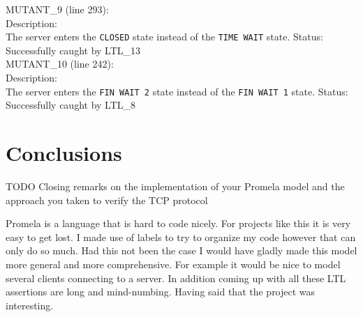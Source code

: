 \documentclass{WigReport} \usepackage{epsfig} %
\begin{document}
MUTANT\_9 (line 293):\\
Description:\\
The server enters the \verb|CLOSED| state instead of the \verb|TIME WAIT| state.
Status: Successfully caught by LTL\_13
\\

MUTANT\_10 (line 242):\\
Description:\\
The server enters the \verb|FIN WAIT 2| state instead of the \verb|FIN WAIT 1| state.
Status: Successfully caught by LTL\_8
\\

\section{Conclusions}

TODO Closing remarks on the implementation of your Promela model and the
approach you taken to verify the TCP protocol

Promela is a language that is hard to code nicely. For projects like this it
is very easy to get lost. I made use of labels to try to organize my code
however that can only do so much. Had this not been the case I would have
gladly made this model more general and more comprehensive. For example it
would be nice to model several clients connecting to a server. In addition
coming up with all these LTL assertions are long and mind-numbing. Having said
that the project was interesting.
\end{document}

